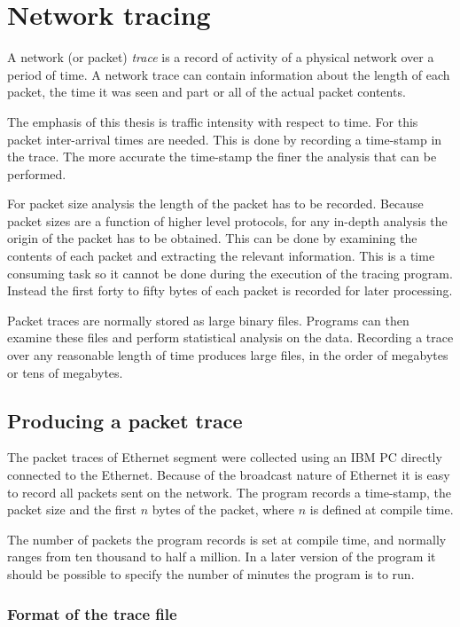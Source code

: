 \chapter{Network tracing}
\label{trace}

A network (or packet) {\em trace} is a record of activity of a
physical network over a period of time.  A network trace can contain
information about the length of each packet, the time it was seen and
part or all of the actual packet contents.

The emphasis of this thesis is traffic intensity with respect to time.
For this packet inter-arrival times are needed.  This is done by
recording a time-stamp in the trace.  The more accurate the time-stamp
the finer the analysis that can be performed.

For packet size analysis the length of the packet has to be recorded.
Because packet sizes are a function of higher level protocols, for any
in-depth analysis the origin of the packet has to be obtained.  This
can be done by examining the contents of each packet and extracting
the relevant information.  This is a time consuming task so it cannot
be done during the execution of the tracing program.  Instead the
first forty to fifty bytes of each packet is recorded for later
processing.

Packet traces are normally stored as large binary files.  Programs can
then examine these files and perform statistical analysis on the data.
Recording a trace over any reasonable length of time produces large
files, in the order of megabytes or tens of megabytes.

\section{Producing a packet trace}

The packet traces of Ethernet segment were collected using an IBM PC
directly connected to the Ethernet.  Because of the broadcast nature
of Ethernet it is easy to record all packets sent on the network.  The
program records a time-stamp, the packet size and the first $n$ bytes
of the packet, where $n$ is defined at compile time.

The number of packets the program records is set at compile time, and
normally ranges from ten thousand to half a million.  In a later version
of the program it should be possible to specify the number of minutes
the program is to run.

\subsection{Format of the trace file}

